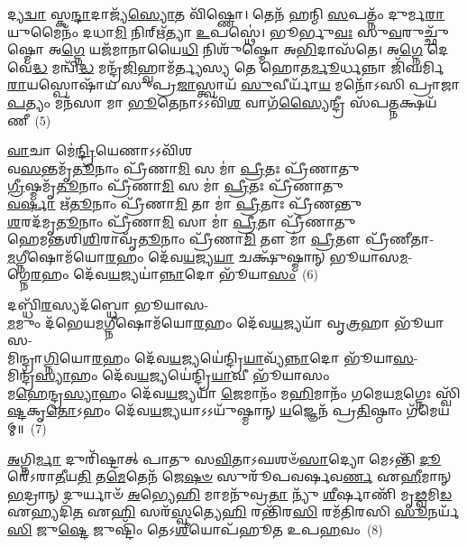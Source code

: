 𑌦𑍍𑌯\-\ul{𑌦𑍍𑌵𑌾} 𑌸𑍍𑌕\-\ul{𑌨𑍍𑌦𑌾}\-𑌦𑌾𑌜𑍍𑌯᳴\-\ul{𑌸𑍍𑌯𑍋}\-𑌤 𑌵𑌿᳴𑌷𑍍𑌣𑍋। 𑌤𑍇𑌨᳴ 𑌹𑌨𑍍𑌮𑌿 \ul{𑌸}\-𑌪𑌤𑍍𑌨𑌂᳴ 𑌦𑍁𑌰𑍍𑌮\-\ul{𑌰𑌾}\-𑌯𑍁𑌮𑍈𑌨𑌂᳴ 𑌦𑌧𑌾\-\ul{𑌮𑌿} 𑌨𑌿𑌰𑍍\mbox{}𑌋᳴𑌤𑍍𑌯𑌾 \ul{𑌉}\-𑌪𑌸𑍍𑌥𑍇॑। 𑌭𑍂𑌰𑍍𑌭𑍁\-\ul{𑌵𑌃} 𑌸𑍁\-\ul{𑌵}\-𑌰𑍁𑌚𑍍𑌛𑍁᳴𑌷𑍍𑌮𑍋 𑌅\-\ul{𑌗𑍍𑌨𑍇} 𑌯𑌜᳴𑌮𑌾𑌨𑌾𑌯𑍈\-\ul{𑌧𑌿} 𑌨𑌿𑌶𑍁᳴𑌷𑍍𑌮𑍋 𑌅\-\ul{𑌭𑌿}\-𑌦𑌾𑌸᳴𑌤𑍇। 𑌅\-\ul{𑌗𑍍𑌨𑍇} 𑌦𑍇𑌵𑍇॑\-\ul{𑌦𑍍𑌧} 𑌮𑌨𑍍𑌵𑌿᳴\-\ul{𑌦𑍍𑌧} 𑌮𑌨𑍍𑌦𑍍𑌰᳴\-\ul{𑌜𑌿}\-𑌹𑍍𑌵𑌾𑌮᳴𑌰𑍍𑌤𑍍𑌯𑌸𑍍𑌯 𑌤𑍇 𑌹𑍋𑌤\-\ul{𑌰𑍍𑌮𑍂}\-𑌰𑍍𑌧𑌨𑍍𑌨𑌾 𑌜𑌿᳴𑌘𑌰𑍍𑌮𑌿 \ul{𑌰𑌾}\-𑌯𑌸𑍍𑌪𑍋𑌷𑌾᳴𑌯 𑌸𑍁𑌪𑍍𑌰\-\ul{𑌜𑌾}\-𑌸𑍍𑌤𑍍𑌵𑌾𑌯᳴ \ul{𑌸𑍁}\-𑌵𑍀𑌰𑍍𑌯𑌾᳴\-\ul{𑌯} 𑌮𑌨𑍋᳴\-𑌽𑌸𑌿 𑌪𑍍𑌰𑌾𑌜𑌾\-\ul{𑌪}\-𑌤𑍍𑌯𑌂 𑌮𑌨᳴𑌸𑌾 𑌮𑌾 \ul{𑌭𑍂}\-𑌤𑍇𑌨𑌾\-𑌽\-𑌽𑌵𑌿᳴\-\ul{𑌶} 𑌵𑌾𑌗᳴\-\ul{𑌸𑍍𑌯𑍈}\-𑌨𑍍𑌦𑍍𑌰𑍀 𑌸᳴𑌪\-\ul{𑌤𑍍𑌨}\-𑌕𑍍𑌷𑌯᳴𑌣𑍀~(5)

\-\ul{𑌵𑌾}\-𑌚𑌾 𑌮𑍇॑\-\ul{𑌨𑍍𑌦𑍍𑌰𑌿}\-𑌯𑍇𑌣𑌾\-𑌽\-𑌽𑌵𑌿᳴𑌶\\
𑌵\-\ul{𑌸}\-𑌨𑍍𑌤𑌮𑍃᳴\-\ul{𑌤𑍂}\-𑌨𑌾𑌂 𑌪𑍍𑌰𑍀᳴𑌣𑌾\-\ul{𑌮𑌿} 𑌸 𑌮𑌾॑ \ul{𑌪𑍍𑌰𑍀}\-𑌤𑌃 𑌪𑍍𑌰𑍀᳴𑌣𑌾𑌤𑍁\\
\-\ul{𑌗𑍍𑌰𑍀}\-𑌷𑍍𑌮𑌮𑍃᳴\-\ul{𑌤𑍂}\-𑌨𑌾𑌂 𑌪𑍍𑌰𑍀᳴𑌣𑌾\-\ul{𑌮𑌿} 𑌸 𑌮𑌾॑ \ul{𑌪𑍍𑌰𑍀}\-𑌤𑌃 𑌪𑍍𑌰𑍀᳴𑌣𑌾𑌤𑍁\\
\-\ul{𑌵}\-\-\ul{𑌰𑍍}\-\mbox{}𑌷𑌾 𑌋᳴\-\ul{𑌤𑍂}\-𑌨𑌾𑌂 𑌪𑍍𑌰𑍀᳴𑌣𑌾\-\ul{𑌮𑌿} 𑌤𑌾 𑌮𑌾॑ \ul{𑌪𑍍𑌰𑍀}\-𑌤𑌾𑌃 𑌪𑍍𑌰𑍀᳴𑌣𑌨𑍍𑌤𑍁\\
\-\ul{𑌶}\-𑌰𑌦᳴𑌮𑍃\-\ul{𑌤𑍂}\-𑌨𑌾𑌂 𑌪𑍍𑌰𑍀᳴𑌣𑌾\-\ul{𑌮𑌿} 𑌸𑌾 𑌮𑌾॑ \ul{𑌪𑍍𑌰𑍀}\-𑌤𑌾 𑌪𑍍𑌰𑍀᳴𑌣𑌾𑌤𑍁\\
𑌹𑍇𑌮𑌨𑍍𑌤𑌶𑌿\-\ul{𑌶𑌿}\-𑌰𑌾𑌵𑍃᳴\-\ul{𑌤𑍂}\-𑌨𑌾𑌂 𑌪𑍍𑌰𑍀᳴𑌣𑌾\-\ul{𑌮𑌿} 𑌤𑍗 𑌮𑌾॑ \ul{𑌪𑍍𑌰𑍀}\-𑌤𑍗 𑌪𑍍𑌰𑍀᳴𑌣𑍀𑌤𑌾-\\
\-\ul{𑌮}\-𑌗𑍍𑌨𑍀𑌷𑍋𑌮᳴𑌯𑍋\-\ul{𑌰}\-𑌹𑌂 𑌦𑍇᳴𑌵\-\ul{𑌯}\-𑌜𑍍𑌯\-\ul{𑌯𑌾} 𑌚𑌕𑍍𑌷𑍁᳴𑌷𑍍𑌮𑌾𑌨𑍍 𑌭𑍂𑌯𑌾𑌸\-\ul{𑌮}\--\\
𑌗𑍍𑌨𑍇\-\ul{𑌰}\-𑌹𑌂 𑌦𑍇᳴𑌵\-\ul{𑌯}\-𑌜𑍍𑌯𑌯𑌾॑\-\ul{𑌨𑍍𑌨𑌾}\-𑌦𑍋 𑌭𑍂᳴𑌯𑌾\-\ul{𑌸𑌂}\-~(6)

𑌦𑌬𑍍𑌧𑌿᳴\-\ul{𑌰}\-𑌸𑍍𑌯𑌦᳴𑌬𑍍𑌧𑍋 𑌭𑍂𑌯𑌾𑌸-\\
\-\ul{𑌮}\-𑌮𑍁𑌂 𑌦᳴𑌭𑍇𑌯\-\ul{𑌮}\-𑌗𑍍𑌨𑍀𑌷𑍋𑌮᳴𑌯𑍋\-\ul{𑌰}\-𑌹𑌂 𑌦𑍇᳴𑌵\-\ul{𑌯}\-𑌜𑍍𑌯𑌯𑌾᳴ 𑌵𑍃\-\ul{𑌤𑍍𑌰}\-𑌹𑌾 𑌭𑍂᳴𑌯𑌾𑌸-\\
𑌮𑌿𑌨𑍍𑌦𑍍𑌰𑌾\-\ul{𑌗𑍍𑌨𑌿}\-𑌯𑍋\-\ul{𑌰}\-𑌹𑌂 𑌦𑍇᳴𑌵\-\ul{𑌯}\-𑌜𑍍𑌯𑌯𑍇॑𑌨𑍍𑌦𑍍𑌰𑌿\-\ul{𑌯𑌾}\-\-𑌵𑍍𑌯᳴\-\ul{𑌨𑍍𑌨𑌾}\-𑌦𑍋 𑌭𑍂᳴𑌯𑌾\-\ul{𑌸}\--\\
𑌮𑌿𑌨𑍍𑌦𑍍𑌰᳴\-\ul{𑌸𑍍𑌯𑌾}\-𑌹𑌂 𑌦𑍇᳴𑌵\-\ul{𑌯}\-𑌜𑍍𑌯𑌯𑍇॑𑌨𑍍𑌦𑍍𑌰𑌿\-\ul{𑌯𑌾}\-𑌵𑍀 𑌭𑍂᳴𑌯𑌾𑌸𑌂\\
𑌮\-\ul{𑌹𑍇}\-𑌨𑍍𑌦𑍍𑌰\-\ul{𑌸𑍍𑌯𑌾}\-𑌹𑌂 𑌦𑍇᳴𑌵\-\ul{𑌯}\-𑌜𑍍𑌯𑌯𑌾᳴ \ul{𑌜𑍇}\-𑌮𑌾𑌨𑌂᳴ 𑌮\-\ul{𑌹𑌿}\-𑌮𑌾𑌨𑌂᳴ 𑌗𑌮𑍇𑌯\-\ul{𑌮}\-𑌗𑍍𑌨𑍇𑌃 𑌸𑍍𑌵𑌿᳴\-\ul{𑌷𑍍𑌟}\-𑌕𑍃\-\ul{𑌤𑍋}\-\-𑌽𑌹𑌂 𑌦𑍇᳴𑌵\-\ul{𑌯}\-𑌜𑍍𑌯𑌯𑌾\-𑌽\-𑌽𑌯𑍁᳴𑌷𑍍𑌮𑌾𑌨𑍍 \ul{𑌯}\-𑌜𑍍𑌞𑍇𑌨᳴ 𑌪𑍍𑌰\-\ul{𑌤𑌿}\-𑌷𑍍𑌠𑌾𑌂 𑌗᳴𑌮𑍇𑌯𑌮𑍍॥~(7)

{\anuvakamend[{𑌰𑌿𑌷𑍍𑌯𑌾॑𑌥𑍍𑌸𑌪\-\ul{𑌤𑍍𑌨}\-𑌕𑍍𑌷𑌯᳴𑌣𑍍𑌯\-\ul{𑌨𑍍𑌨𑌾}\-𑌦𑍋 𑌭𑍂᳴𑌯𑌾\-\ul{𑌸}\-\-\ul{𑍞} 𑌷𑌟𑍍𑌤𑍍𑌰𑌿𑍞᳴𑌶𑌚𑍍𑌚}]}%

\-\ul{𑌅}\-𑌗𑍍𑌨𑌿\-\ul{𑌰𑍍𑌮𑌾} 𑌦𑍁𑌰𑌿᳴𑌷𑍍𑌟𑌾𑌤𑍍 𑌪𑌾𑌤𑍁 𑌸\-\ul{𑌵𑌿}\-𑌤𑌾\-𑌽𑌘𑌶𑍞᳴\-\ul{𑌸𑌾}\-𑌦𑍍𑌯𑍋 𑌮𑍇\-𑌽𑌨𑍍𑌤𑌿᳴ \ul{𑌦𑍂}\-𑌰𑍇᳴\-𑌽𑌰𑌾\-\ul{𑌤𑍀}\-𑌯\-\ul{𑌤𑌿} 𑌤\-\ul{𑌮𑍇}\-𑌤𑍇𑌨᳴ 𑌜𑍇\-\ul{𑌷}\-\-\ul{𑍞} 𑌸𑍁𑌰𑍂᳴𑌪𑌵𑌰𑍍\mbox{}𑌷𑌵\-\ul{𑌰𑍍𑌣} 𑌏\-\ul{𑌹𑍀}\-𑌮𑌾𑌨𑍍 \ul{𑌭}\-𑌦𑍍𑌰𑌾𑌨𑍍 𑌦𑍁𑌰𑍍𑌯𑌾𑍞᳴ \ul{𑌅}\-𑌭𑍍𑌯𑍇\-\ul{𑌹𑌿} 𑌮𑌾𑌮𑌨𑍁᳴𑌵𑍍𑌰\-\ul{𑌤𑌾} 𑌨𑍍𑌯𑍁᳴ \ul{𑌶𑍀}\-𑌰𑍍\mbox{}𑌷𑌾𑌣𑌿᳴ 𑌮𑍃\-\ul{𑌢𑍍𑌵}\-𑌮𑌿\-\ul{𑌡} 𑌏𑌹𑍍𑌯𑌦𑌿᳴\-\ul{𑌤} 𑌏\-\ul{𑌹𑌿} 𑌸𑌰᳴\-\ul{𑌸𑍍𑌵}\-𑌤𑍍𑌯𑍇\-\ul{𑌹𑌿} 𑌰𑌨𑍍𑌤𑌿᳴𑌰\-\ul{𑌸𑌿} 𑌰𑌮᳴𑌤𑌿𑌰𑌸𑌿 \ul{𑌸𑍂}\-𑌨𑌰𑍍𑌯᳴\-\ul{𑌸𑌿} 𑌜𑍁\-\ul{𑌷𑍍𑌟𑍇} 𑌜𑍁𑌷𑍍𑌟𑌿𑌂᳴ 𑌤𑍇\-𑌽\-\ul{𑌶𑍀}\-𑌯𑍋𑌪᳴𑌹𑍂𑌤 𑌉𑌪\-\ul{𑌹}\-𑌵𑌂~(8)

